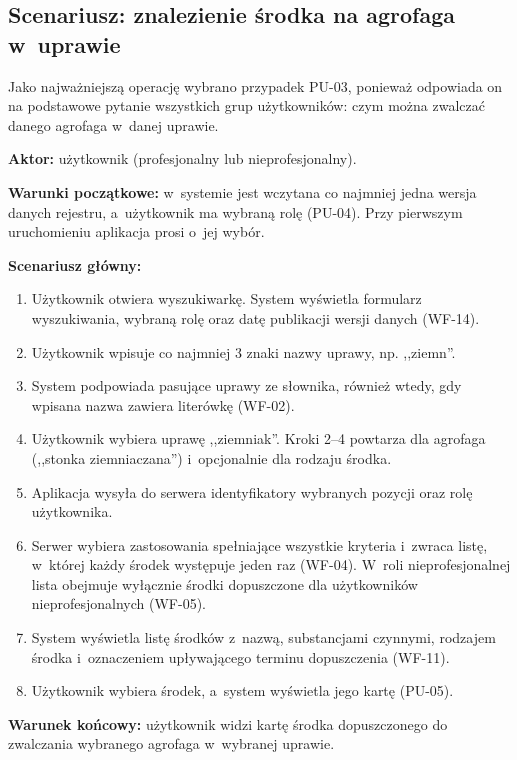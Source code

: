 \subsection{Scenariusz: znalezienie środka na agrofaga w~uprawie}

Jako najważniejszą operację wybrano przypadek PU-03, ponieważ odpowiada on na
podstawowe pytanie wszystkich grup użytkowników: czym można zwalczać danego
agrofaga w~danej uprawie.

\textbf{Aktor:} użytkownik (profesjonalny lub nieprofesjonalny).

\textbf{Warunki początkowe:} w~systemie jest wczytana co najmniej jedna wersja
danych rejestru, a~użytkownik ma wybraną rolę (PU-04). Przy pierwszym
uruchomieniu aplikacja prosi o~jej wybór.

\textbf{Scenariusz główny:}

\begin{enumerate}
    \item Użytkownik otwiera wyszukiwarkę. System wyświetla formularz
    wyszukiwania, wybraną rolę oraz datę publikacji wersji danych (WF-14).
    \item Użytkownik wpisuje co najmniej 3 znaki nazwy uprawy, np.
    ,,ziemn''.
    \item System podpowiada pasujące uprawy ze słownika, również wtedy, gdy
    wpisana nazwa zawiera literówkę (WF-02).
    \item Użytkownik wybiera uprawę ,,ziemniak''. Kroki 2--4 powtarza dla
    agrofaga (,,stonka ziemniaczana'') i~opcjonalnie dla rodzaju środka.
    \item Aplikacja wysyła do serwera identyfikatory wybranych pozycji oraz
    rolę użytkownika.
    \item Serwer wybiera zastosowania spełniające wszystkie kryteria
    i~zwraca listę, w~której każdy środek występuje jeden raz (WF-04).
    W~roli nieprofesjonalnej lista obejmuje wyłącznie środki dopuszczone dla
    użytkowników nieprofesjonalnych (WF-05).
    \item System wyświetla listę środków z~nazwą, substancjami czynnymi,
    rodzajem środka i~oznaczeniem upływającego terminu dopuszczenia (WF-11).
    \item Użytkownik wybiera środek, a~system wyświetla jego kartę (PU-05).
\end{enumerate}

\textbf{Warunek końcowy:} użytkownik widzi kartę środka dopuszczonego do
zwalczania wybranego agrofaga w~wybranej uprawie.

